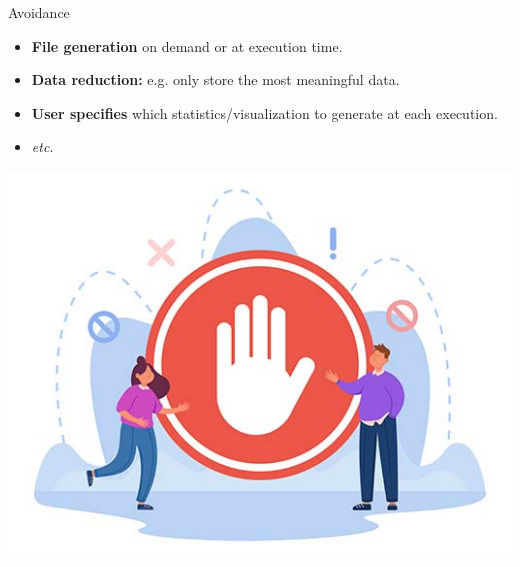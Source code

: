\begin{frame}{Avoidance}
  \begin{minipage}{0.6\textwidth}
    \begin{itemize}
      \item \textbf{File generation} on demand or at execution time.
      \item \textbf{Data reduction:} e.g. only store the most meaningful data.
      \item \textbf{User specifies} which statistics/visualization to generate at each execution.
      \item \textit{etc.}
    \end{itemize}
  \end{minipage}%
  \hfill
  \begin{minipage}{0.4\textwidth}
    \centering
    \includegraphics[width=\linewidth]{images/avoidance.jpg}
  \end{minipage}
\end{frame}

